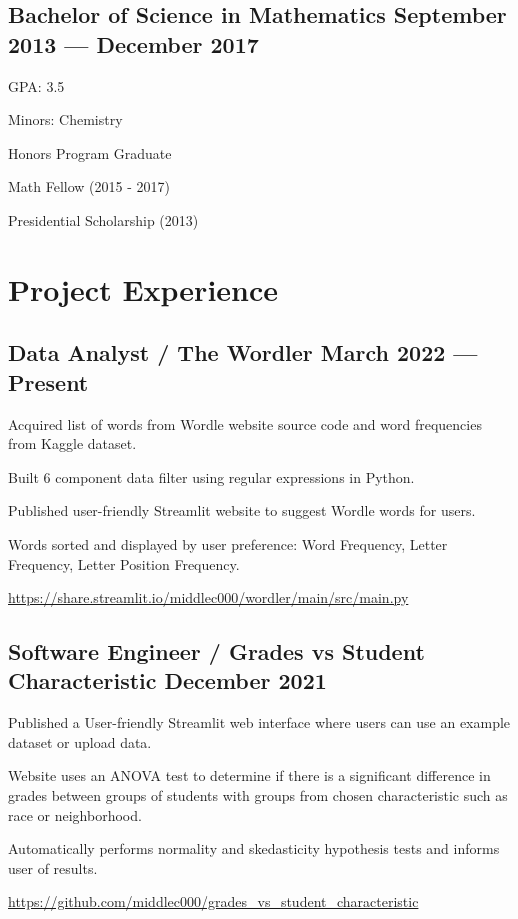 \documentclass[letter,10pt]{article}
\begin{document}
\subsection{{Bachelor of Science in Mathematics \hfill September 2013 --- December 2017}}
\begin{zitemize}
    \item GPA: 3.5
    \item Minors: Chemistry
    \item Honors Program Graduate
    \item Math Fellow (2015 - 2017)
    \item Presidential Scholarship (2013)
\end{zitemize}

\section{Project Experience}
\subsection{{Data Analyst / The Wordler \hfill March 2022 --- Present}}
\begin{zitemize}
    \item Acquired list of words from Wordle website source code and word frequencies from Kaggle dataset.
    \item Built 6 component data filter using regular expressions in Python.
    \item Published user-friendly Streamlit website to suggest Wordle words for users.
    \item Words sorted and displayed by user preference: Word Frequency, Letter Frequency, Letter Position Frequency.
    \item \url{https://share.streamlit.io/middlec000/wordler/main/src/main.py}
\end{zitemize}

\subsection{{Software Engineer / Grades vs Student Characteristic \hfill December 2021}}
\begin{zitemize}
    \item Published a User-friendly Streamlit web interface where users can use an example dataset or upload data.
    \item Website uses an ANOVA test to determine if there is a significant difference in grades between groups of students with groups from chosen characteristic such as race or neighborhood.
    \item Automatically performs normality and skedasticity hypothesis tests and informs user of results.
    \item \url{https://github.com/middlec000/grades_vs_student_characteristic}
\end{zitemize}
\end{document}
